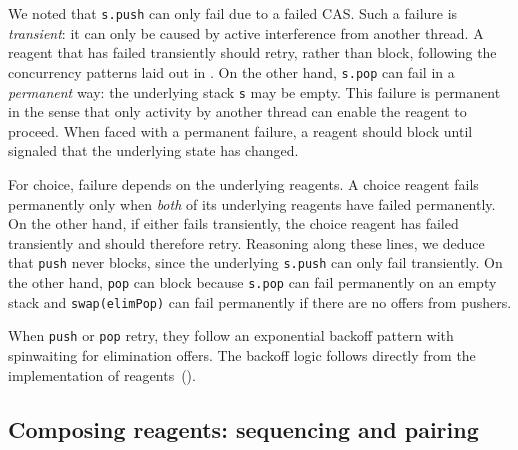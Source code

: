 \documentclass[preprint,nocopyrightspace]{sigplanconf}
\begin{document}
We noted that \lstinline{s.push} can only fail due to a failed CAS.
Such a failure is \emph{transient}: it can only be caused by active
interference from another thread.  A reagent that has failed
transiently should retry, rather than block, following the concurrency
patterns laid out in .  On the other hand,
\lstinline{s.pop} can fail in a \emph{permanent} way: the underlying
stack \lstinline{s} may be empty.  This failure is permanent in the
sense that only activity by another thread can enable the reagent to
proceed.  When faced with a permanent failure, a reagent should block
until signaled that the underlying state has changed.

For choice, failure depends on the underlying reagents.  A choice
reagent fails permanently only when \emph{both} of its underlying
reagents have failed permanently.  On the other hand, if either fails
transiently, the choice reagent has failed transiently and should
therefore retry.  Reasoning along these lines, we deduce that
\lstinline{push} never blocks, since the underlying \lstinline{s.push}
can only fail transiently.  On the other hand, \lstinline{pop} can
block because \lstinline{s.pop} can fail permanently on an empty stack
and \lstinline{swap(elimPop)} can fail permanently if there are no
offers from pushers.

When \lstinline{push} or \lstinline{pop} retry, they follow an
exponential backoff pattern with spinwaiting for elimination
offers.  The backoff
logic follows directly from the implementation of reagents~().



\subsection{Composing reagents: sequencing and pairing}
\label{sec:conjunction}
\end{document}
